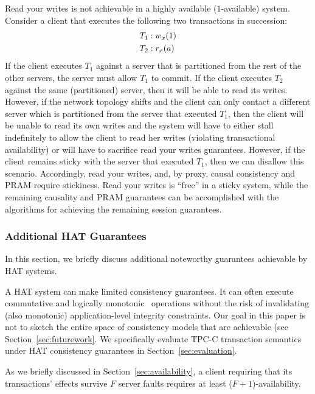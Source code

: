 Read your writes is not achievable in a highly available
($1$-available) system. Consider a client that executes the following
two transactions in succession:
\vspace{-.5em}
\begin{align*}
\small
T_1 &: w_x(1)
\\T_2 &: r_x(a)
\end{align*}
If the client executes $T_1$ against a server that is partitioned from
the rest of the other servers, the server must allow $T_1$ to
commit. If the client executes $T_2$ against the same (partitioned)
server, then it will be able to read its writes. However, if the
network topology shifts and the client can only contact a different
server which is partitioned from the server that executed $T_1$, then
the client will be unable to read its own writes and the system will
have to either stall indefinitely to allow the client to read her
writes (violating transactional availability) or will have to
sacrifice read your writes guarantees. However, if the client remains
sticky with the server that executed $T_1$, then we can disallow this
scenario. Accordingly, read your writes, and, by proxy, causal
consistency and PRAM require stickiness. Read your writes is ``free''
in a sticky system, while the remaining causality and PRAM guarantees
can be accomplished with the algorithms for achieving the remaining
session guarantees.

\subsubsection{Additional HAT Guarantees}

In this section, we briefly discuss additional noteworthy guarantees
achievable by HAT systems.

 A HAT system can make limited
consistency guarantees. It can often execute commutative and logically
monotonic~\cite{calm} operations without the risk of invalidating
(also monotonic) application-level integrity constraints. Our goal in
this paper is not to sketch the entire space of consistency models
that are achievable (see Section~\ref{sec:futurework}. We specifically
evaluate TPC-C transaction semantics under HAT consistency guarantees
in Section~\ref{sec:evaluation}.

\vspace{.5em} As we briefly discussed in
Section~\ref{sec:availability}, a client requiring that its
transactions' effects survive $F$ server faults requires at least
($F+1$)-availability.

